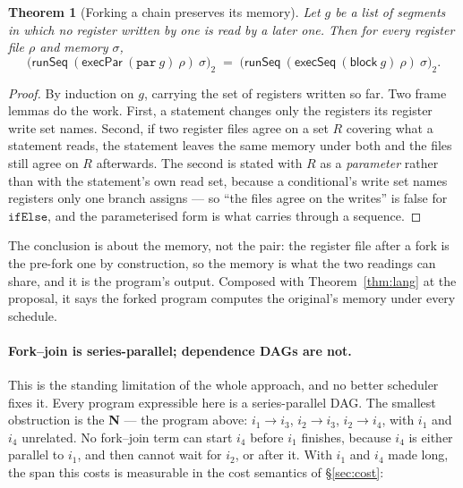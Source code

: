 \documentclass[11pt,a4paper]{article}
\theoremstyle{definition}
\theoremstyle{plain}
\newtheorem{theorem}[definition]{Theorem}
\theoremstyle{remark}
\newcommand{\st}{\sigma}
\newcommand{\runSeq}{\mathsf{runSeq}}
\begin{document}
\begin{theorem}[Forking a chain preserves its memory]\label{thm:forkheap}
Let $g$ be a list of segments in which no register written by one is read by a later one. Then
for every register file $\rho$ and memory $\st$,
\[
  \bigl(\runSeq\ (\mathsf{execPar}\ (\texttt{par}\ g)\ \rho)\ \st\bigr)_2
  \;=\;
  \bigl(\runSeq\ (\mathsf{execSeq}\ (\mathsf{block}\ g)\ \rho)\ \st\bigr)_2 .
\]
\end{theorem}

\begin{proof}
By induction on $g$, carrying the set of registers written so far. Two frame lemmas do the
work. First, a statement changes only the registers its register write set names. Second, if
two register files agree on a set $R$ covering what a statement reads, the statement leaves
the same memory under both and the files still agree on $R$ afterwards. The second is stated
with $R$ as a \emph{parameter} rather than with the statement's own read set, because a
conditional's write set names registers only one branch assigns --- so ``the files agree on
the writes'' is false for $\texttt{ifElse}$, and the parameterised form is what carries
through a sequence.
\end{proof}

The conclusion is about the memory, not the pair: the register file after a fork is the
pre-fork one by construction, so the memory is what the two readings can share, and it is the
program's output. Composed with Theorem~\ref{thm:lang} at the proposal, it says the forked
program computes the original's memory under every schedule.

\paragraph{Fork--join is series-parallel; dependence DAGs are not.}
This is the standing limitation of the whole approach, and no better scheduler fixes it.
Every program expressible here is a series-parallel DAG. The smallest obstruction is the
\textbf{N} --- the program above: $i_1 \to i_3$, $i_2 \to i_3$, $i_2 \to i_4$, with $i_1$ and
$i_4$ unrelated. No fork--join term can start $i_4$ before $i_1$ finishes, because $i_4$ is
either parallel to $i_1$, and then cannot wait for $i_2$, or after it. With $i_1$ and $i_4$
made long, the span this costs is measurable in the cost semantics of \S\ref{sec:cost}:
\end{document}
